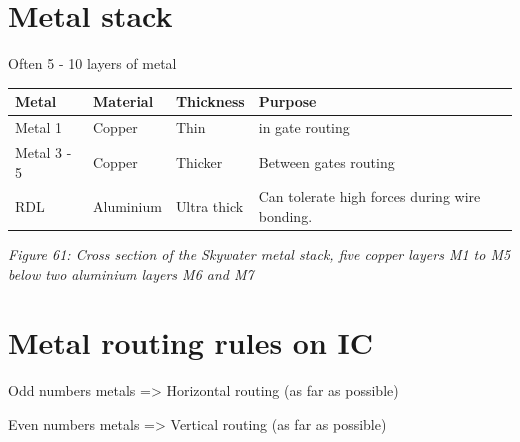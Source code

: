 \section{Metal stack}\label{metal-stack}

Often 5 - 10 layers of metal

\begin{longtable}[]{@{}
  >{\centering\arraybackslash}p{}
  >{\centering\arraybackslash}p{}
  >{\centering\arraybackslash}p{}
  >{\centering\arraybackslash}p{}@{}}
\toprule\noalign{}
\begin{minipage}[b]{\linewidth}\centering
Metal
\end{minipage} & \begin{minipage}[b]{\linewidth}\centering
Material
\end{minipage} & \begin{minipage}[b]{\linewidth}\centering
Thickness
\end{minipage} & \begin{minipage}[b]{\linewidth}\centering
Purpose
\end{minipage} \\
\midrule\noalign{}
\endhead
\bottomrule\noalign{}
\endlastfoot
Metal 1 & Copper & Thin & in gate routing \\
Metal 3 - 5 & Copper & Thicker & Between gates routing \\
RDL & Aluminium & Ultra thick & Can tolerate high forces during wire
bonding. \\
\end{longtable}


{
\centering
{}
}

\emph{Figure 61: Cross section of the Skywater metal stack, five copper
layers M1 to M5 below two aluminium layers M6 and M7}

\section{Metal routing rules on IC}\label{metal-routing-rules-on-ic}

Odd numbers metals =\textgreater{} Horizontal routing (as far as
possible)

Even numbers metals =\textgreater{} Vertical routing (as far as
possible)

